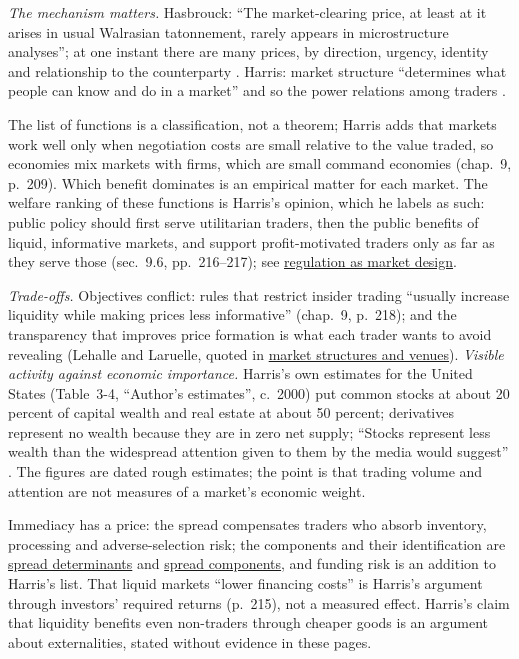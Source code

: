 \begin{qfdefinition}
\begin{itemize}
\end{itemize}
\emph{The mechanism matters.} Hasbrouck: ``The market-clearing price, at least at it arises in usual Walrasian tatonnement, rarely appears in microstructure analyses''; at one instant there are many prices, by direction, urgency, identity and relationship to the counterparty \citep[chap.~1, sec.~1.1.3, p.~4]{s6-hasbrouck}. Harris: market structure ``determines what people can know and do in a market'' and so the power relations among traders \citep[chap.~5, p.~89]{alpha-harris}.

 The list of functions is a classification, not a theorem; Harris adds that markets work well only when negotiation costs are small relative to the value traded, so economies mix markets with firms, which are small command economies (chap.~9, p.~209). Which benefit dominates is an empirical matter for each market. The welfare ranking of these functions is Harris's opinion, which he labels as such: public policy should first serve utilitarian traders, then the public benefits of liquid, informative markets, and support profit-motivated traders only as far as they serve those (sec.~9.6, pp.~216--217); see \hyperref[def:market-regulation-design]{regulation as market design}.

 \emph{Trade-offs.} Objectives conflict: rules that restrict insider trading ``usually increase liquidity while making prices less informative'' (chap.~9, p.~218); and the transparency that improves price formation is what each trader wants to avoid revealing (Lehalle and Laruelle, quoted in \hyperref[def:market-structures-venues]{market structures and venues}). \emph{Visible activity against economic importance.} Harris's own estimates for the United States (Table~3-4, ``Author's estimates'', c.\ 2000) put common stocks at about 20 percent of capital wealth and real estate at about 50 percent; derivatives represent no wealth because they are in zero net supply; ``Stocks represent less wealth than the widespread attention given to them by the media would suggest'' \citep[chap.~3, sec.~3.4.1, p.~45]{alpha-harris}. The figures are dated rough estimates; the point is that trading volume and attention are not measures of a market's economic weight.

 Immediacy has a price: the spread compensates traders who absorb inventory, processing and adverse-selection risk; the components and their identification are \hyperref[res:spread-determinants]{spread determinants} and \hyperref[res:spread-component-identification]{spread components}, and funding risk is an addition to Harris's list. That liquid markets ``lower financing costs'' is Harris's argument through investors' required returns (p.~215), not a measured effect. Harris's claim that liquidity benefits even non-traders through cheaper goods is an argument about externalities, stated without evidence in these pages.


\end{qfdefinition}
